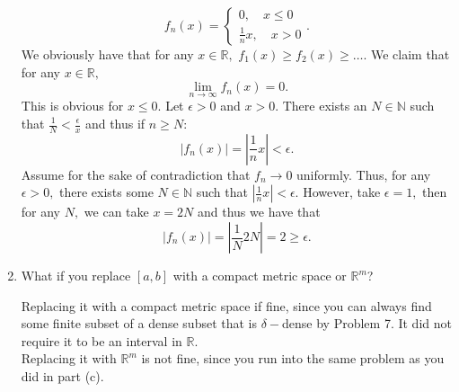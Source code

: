 \documentclass[11pt]{article}
\newcommand{\bbN}{\mathbb{N}}
\newcommand{\bbR}{\mathbb{R}}
\begin{document}
\begin{enumerate}
\begin{solution}
        \[f_n(x) = 
        \begin{cases}
            0, \quad x\leq 0\\
            \frac{1}{n}x, \quad x>0
        \end{cases}.\] We obviously have that for any $x\in \bbR,$ $f_1(x)\geq f_2(x)\geq \dots.$ We claim that for any $x\in \bbR,$
        \[\lim_{n\to \infty}f_n(x) = 0.\] This is obvious for $x\leq 0.$ Let $\epsilon>0$ and $x>0.$ There exists an $N \in \bbN$ such that $\frac{1}{N}< \frac{\epsilon}{x}$ and thus if $n\geq N:$
        \[|f_n(x)| = |\frac{1}{n}x|< \epsilon.\] Assume for the sake of contradiction that $f_n \to 0$ uniformly. Thus, for any $\epsilon>0,$ there exists some $N \in \bbN$ such that $|\frac{1}{n}x|< \epsilon.$ However, take $\epsilon =1,$ then for any $N,$ we can take $x = 2N$ and thus we have that 
        \[|f_n(x)| = |\frac{1}{N}2N| = 2 \geq \epsilon.\]
    \end{solution}
    \item 
    \begin{problem}
        What if you replace $[a,b]$ with a compact metric space or $\bbR^m$?
    \end{problem}
    \begin{solution}
        Replacing it with a compact metric space if fine, since you can always find some finite subset of a dense subset that is $\delta-$dense by Problem 7. It did not require it to be an interval in $\bbR.$\\

        Replacing it with $\bbR^m$ is not fine, since you run into the same problem as you did in part (c).
    \end{solution}
\end{enumerate}

\newpage
\end{document}
